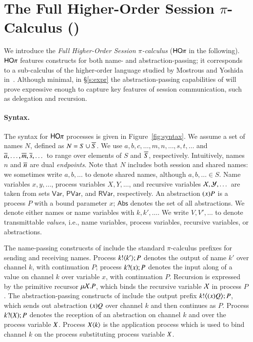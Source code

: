 \section{The Full Higher-Order Session $\pi$-Calculus (\HOp)}

We introduce the {\em Full Higher-Order Session $\pi$-calculus}
($\mathsf{HO}\pi$ in the following).
$\mathsf{HO}\pi$ features constructs for both name- and abstraction-passing;
it corresponds to a sub-calculus 
of the higher-order language studied by Mostrous and Yoshida in~\cite{tlca07}.
Although minimal, in \S\ref{s:expr}
the abstraction-passing capabilities of \HOp will prove 
expressive enough to capture key features of session communication, 
such as delegation and recursion.

\paragraph{Syntax.}

The syntax for $\mathsf{HO}\pi$ processes is given in Figure~\ref{fig:syntax}.
We assume a set of names $N$, defined as $N = S \cup \overline{S}$.
We use $a,b,c, \dots, m, n, \dots, s, t, \dots$ 
and $\overline{a}, \dots, \overline{m}, \overline{s}, \dots$
to range over elements of $S$ and $\overline{S}$, respectively.
Intuitively, names $n$ and $\overline{n}$ are dual \emph{endpoints}.
Note that $N$ includes both session and shared names:
we sometimes write  $a,b, \dots$ to denote shared names,
although $a, b, \dots \in S$.
Name variables $x, y,  \dots$, 
process variables $X, Y,  \dots$,
and recursive variables $\mathcal{X}, \mathcal{Y}, \dots$ 
are taken from sets $\mathsf{Var}$, $\mathsf{PVar}$, and $\mathsf{RVar}$, respectively. 
An abstraction $(x)P$ is a process $P$ with a bound parameter $x$;
$\mathsf{Abs}$ denotes the set of all abstractions.
We denote either names or name variables with $k, k', \dots$.
We write $V, V', \ldots$ to denote 
transmittable \emph{values}, i.e., 
name variables, process variables, recursive variables, or abstractions.

The name-passing construcsts of \HOp include the standard $\pi$-calculus prefixes
for sending and receiving names.
Process $k ! \langle k' \rangle ; P$ denotes the output of name $k'$ over channel $k$,
with continuation $P$;
process $k ? (x) ; P$ denotes the input along  of a value
on channel $k$ over variable $x$, with continuation $P$. 
Recursion is expressed by the primitive recursor $\mu \mathcal{X}. P$,
which binds the recursive variable $\mathcal{X}$ in process $P$.
The abstraction-passing constructs of \HOp include 
the output prefix $k ! \big\langle (x)Q \big\rangle ; P$, which 
sends out abstraction $(x)Q$ over channel $k$ and then continues as $P$. 
Process $k ? (X) ; P$ denotes the reception of an abstraction
on channel $k$ and over the process variable $X$.
Process $X\langle k \rangle$ is the application
process which is used to bind channel $k$ on the process
substituting process variable $X$.

